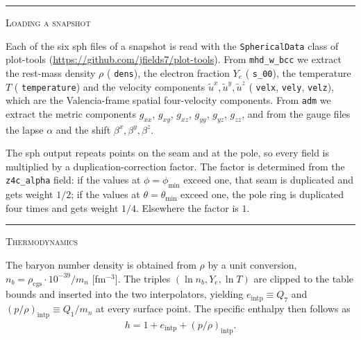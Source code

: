 \documentclass{article}
\newcommand{\var}[1]{%
  {\setlength{\fboxsep}{1.5pt}%
   \colorbox{varbg}{\textcolor{varfg}{\texttt{\small #1}}}}}
\newcommand{\step}[1]{%
  \par\medskip\noindent
  {\color{stepfg}\rule[-0.15ex]{2pt}{1.5ex}\hspace{0.5em}\scshape #1}%
  \hspace{0.75em}\ignorespaces}
\begin{document}
\step{Loading a snapshot} Each of the six sph files of a snapshot is read with
the \var{SphericalData} class of plot-tools
(\url{https://github.com/jfields7/plot-tools}). From \var{mhd\_w\_bcc} we extract
the rest-mass density $\rho$ (\var{dens}), the electron fraction $Y_e$ (\var{s\_00}),
the temperature $T$ (\var{temperature}) and the velocity components
$\tilde{u}^x,\tilde{u}^y,\tilde{u}^z$ (\var{velx}, \var{vely}, \var{velz}), which
are the Valencia-frame spatial four-velocity components. From \var{adm} we extract
the metric components $g_{xx}$, $g_{xy}$, $g_{xz}$, $g_{yy}$, $g_{yz}$, $g_{zz}$, and
from the gauge files the lapse $\alpha$ and the shift $\beta^x,\beta^y,\beta^z$.

The sph output repeats points on the seam and at the pole, so every field is
multiplied by a duplication-correction factor. The factor is determined from the
\var{z4c\_alpha} field: if the values at $\phi=\phi_{\min}$ exceed one, that seam
is duplicated and gets weight $1/2$; if the values at $\theta=\theta_{\min}$ exceed
one, the pole ring is duplicated four times and gets weight $1/4$. Elsewhere the
factor is $1$.

\step{Thermodynamics} The baryon number density is obtained from $\rho$ by a unit
conversion, $n_b=\rho_{\mathrm{cgs}}\cdot 10^{-39}/m_n$ [fm$^{-3}$]. The triples
$(\ln n_b, Y_e, \ln T)$ are clipped to the table bounds and inserted into the two
interpolators, yielding $e_{\mathrm{intp}}\equiv Q_7$ and
$(p/\rho)_{\mathrm{intp}}\equiv Q_1/m_n$ at every surface point. The specific
enthalpy then follows as
\begin{align}
  h = 1 + e_{\mathrm{intp}} + (p/\rho)_{\mathrm{intp}}.
\end{align}
\end{document}
